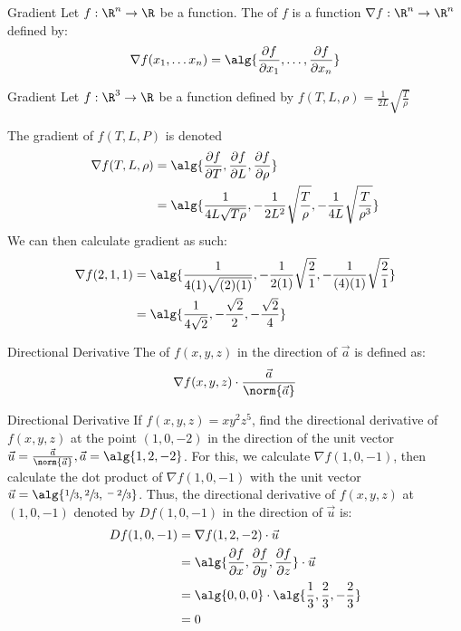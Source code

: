 \documentclass[12pt]{report}
\begin{document}
\begin{dfnbox}{Gradient}{}
    Let $f : \R^n \to \R$ be a function. The  of $f$ is a function $\nabla f : \R^n \to \R^n$ defined by:
    \[ \nabla f(x_1, \ldots x_n) = \alg{ \frac{\partial f}{\partial x_1} , \ldots , \frac{\partial f}{\partial x_n} } \]
\end{dfnbox}

\begin{exbox}{Gradient}{}
    Let $f : \R^3 \to \R$ be a function defined by $f(T,L,\rho) = \frac{1}{2L} \sqrt{\frac{T}{\rho}}$

    The gradient of $f(T,L,P)$ is denoted
    \begin{align*}
        \nabla f(T,L,\rho)
        &= \alg{\frac{\partial f}{\partial T}, \frac{\partial f}{\partial L}, \frac{\partial f}{\partial \rho}} \\
        &= \alg{\frac{1}{4L\sqrt{T \rho}}, -\frac{1}{2L^2} \sqrt{\frac{T}{\rho}}, -\frac{1}{4L} \sqrt{\frac{T}{\rho^3}}}
    \end{align*}
    We can then calculate gradient as such:
    \begin{align*}
        \nabla f(2,1,1)
        &= \alg{ \frac{1}{4(1)\sqrt{(2)(1)}} , -\frac{1}{2(1)}\sqrt{\frac{2}{1}} , -\frac{1}{(4)(1)} \sqrt{\frac{2}{1}} } \\
        &= \alg{ \frac{1}{4\sqrt{2}} , -\frac{\sqrt{2}}{2} , - \frac{\sqrt{2}}{4} }
    \end{align*}
\end{exbox}

\begin{dfnbox}{Directional Derivative}{}
    The  of $f(x,y,z)$ in the direction of $\vec{a}$ is defined as:
    \[ \nabla f(x,y,z) \cdot \frac{\vec{a}}{\norm{\vec{a}}} \]
\end{dfnbox}

\begin{exbox}{Directional Derivative}{}
    If $f(x,y,z) = xy^2z^5$, find the directional derivative of $f(x,y,z)$ at the point $(1,0,-2)$ in the direction of the unit vector $\vec{u} = \frac{\vec{a}}{\norm{\vec{a}}}, \vec{a} = \alg{1,2,-2}$.
    \tcblower
    For this, we calculate $\nabla f(1,0,-1)$, then calculate the dot product of $\nabla f(1,0,-1)$ with the unit vector $\vec{u} = \alg{\sfrac{1}{3}, \sfrac{2}{3}, \sfrac{-2}{3}}$. Thus, the directional derivative of $f(x,y,z)$ at $(1,0,-1)$ denoted by $Df(1,0,-1)$ in the direction of $\vec{u}$ is:
    \begin{align*}
        Df(1,0,-1)
        &= \nabla f(1,2,-2) \cdot \vec{u} \\
        &= \alg{\frac{\partial f}{\partial x}, \frac{\partial f}{\partial y}, \frac{\partial f}{\partial z}} \cdot \vec{u} \\
        &= \alg{0,0,0} \cdot \alg{\frac13, \frac23, -\frac23} \\
        &= 0
    \end{align*}
\end{exbox}
\end{document}
